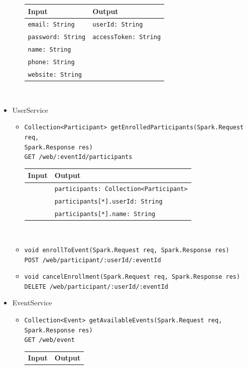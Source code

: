 \documentclass[a4paper, hidelinks, 12pt]{report}
\begin{document}
\begin{itemize}
\begin{itemize}
			\begin{tabular}{l | l}
			\textbf{Input} & \textbf{Output} \\
			\hline
				\verb|email: String| & \verb|userId: String| \\
				\verb|password: String| & \verb|accessToken: String| \\
				\verb|name: String| & \\
				\verb|phone: String| & \\
				\verb|website: String| & \\
			\end{tabular}\\
		\end{itemize}
		\item{UserService}
		\begin{itemize}
			\item{\verb|Collection<Participant> getEnrolledParticipants(Spark.Request req, |\\ \verb|Spark.Response res)|\\ \verb|GET /web/:eventId/participants|}\\
			\begin{tabular}{l | l}
			\textbf{Input} & \textbf{Output} \\
			\hline
				& \verb|participants: Collection<Participant>| \\
				& \verb|participants[*].userId: String| \\
				& \verb|participants[*].name: String| \\
			\end{tabular}\\
			\item{\verb|void enrollToEvent(Spark.Request req, Spark.Response res)|\\ \verb|POST /web/participant/:userId/:eventId|}
			\item{\verb|void cancelEnrollment(Spark.Request req, Spark.Response res)|\\ \verb|DELETE /web/participant/:userId/:eventId|}
		\end{itemize}
		\item{EventService}
			\begin{itemize}
			\item{\verb|Collection<Event> getAvailableEvents(Spark.Request req, Spark.Response res)|\\ \verb|GET /web/event|}\\
			\begin{tabular}{l | l}
			\textbf{Input} & \textbf{Output} \\

\end{tabular}
\end{itemize}
\end{itemize}
\end{document}
